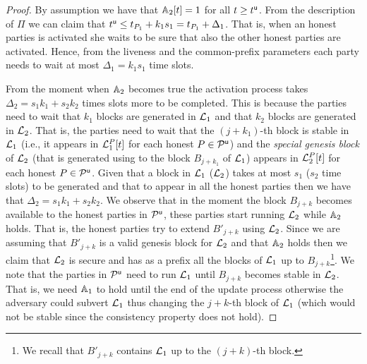 \begin{proof}
By assumption we have that $\mathbb{A}_2[t]=1$ for all $t\geq t^{\mathsf{u}}$. From the description of $\Pi$ we can claim that $t^{\mathsf{u}} \leq t_{P_1}+k_1 s_1=t_{P_1}+\Delta_1$.
That is, when an honest parties is activated she waits to be sure that also the other honest parties are activated. Hence, from the liveness and the common-prefix parameters
each party needs to wait at most $\Delta_1=k_1 s_1$ time slots.

From the moment when $\mathbb{A}_2$ becomes true the activation process takes $\Delta_2=s_1 k_1 + s_2 k_2$  times slots more to be completed.
This is because the parties need to wait that $k_1$ blocks are generated in $\mathcal{L}_1$ and that $k_2$ blocks are generated in $\mathcal{L}_2$. 
That is, the parties need to wait that the $(j+k_1)$-th block is stable in $\mathcal{L}_1$ (i.e., 
it appears in $\mathcal{L}_1^P[t]$ for each honest $P\in\mathcal{P}^\mathsf{u}$) and the \emph{special genesis block} of $\mathcal{L}_2$ (that is generated using to the block $B_{j+k_1}$ of $\mathcal{L}_1$) appears 
in $\mathcal{L}_2^P[t]$ for each honest $P\in\mathcal{P}^\mathsf{u}$. Given that a block in $\mathcal{L}_1$ ($\mathcal{L}_2$) takes at most $s_1$ ($s_2$ time slots) to be generated and that to appear in all the honest parties then we have that $\Delta_2=s_1 k_1 + s_2 k_2$.
We observe that in the moment the block $B_{j+k}$ becomes available to the honest parties in $\mathcal{P}^\mathsf{u}$, these parties start running $\mathcal{L}_2$ while $\mathbb{A}_2$ holds.
That is, the honest parties try to extend $B'_{j+k}$ using $\mathcal{L}_2$. Since we are assuming that $B'_{j+k}$  is a valid genesis block for $\mathcal{L}_2$ and 
that $\mathbb{A}_2$ holds then we claim that $\mathcal{L}_2$ is secure and has as a prefix all the blocks of $\mathcal{L}_1$ up to $B_{j+k}$\footnote{We recall that $B'_{j+k}$
contains $\mathcal{L}_1$ up to the $(j+k)$-th block.}. We note that the parties in $\mathcal{P}^\mathsf{u}$ need to run $\mathcal{L}_1$ until $B_{j+k}$ becomes stable in $\mathcal{L}_2$. That is, we need $\mathbb{A}_1$ to
hold until the end of the update process otherwise the adversary could subvert $\mathcal{L}_1$ thus changing the $j+k$-th block of $\mathcal{L}_1$ (which would not be stable
since the consistency property does not hold).

\end{proof}
